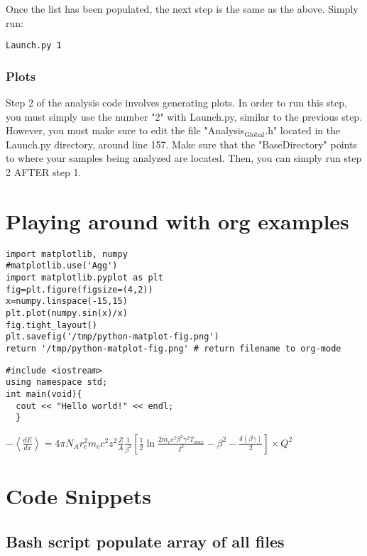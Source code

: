 \documentclass[11pt]{article}
\begin{document}
\begin{enumerate}
Once the list has been populated, the next step is the same as
the above. Simply run:

\begin{verbatim}
Launch.py 1
\end{verbatim}
\end{enumerate}

\subsubsection{Plots}
\label{sec-1-1-5}

Step 2 of the analysis code involves generating plots. In order to
run this step, you must simply use the number "2" with Launch.py,
similar to the previous step. However, you must make sure to edit
the file "Analysis$_{\text{Global}}$.h" located in the Launch.py directory,
around line 157. Make sure that the "BaseDirectory" points to
where your samples being analyzed are located. Then, you can
simply run step 2 AFTER step 1.


\section{Playing around with org examples}
\label{sec-2}

\begin{verbatim}
import matplotlib, numpy
#matplotlib.use('Agg')
import matplotlib.pyplot as plt
fig=plt.figure(figsize=(4,2))
x=numpy.linspace(-15,15)
plt.plot(numpy.sin(x)/x)
fig.tight_layout()
plt.savefig('/tmp/python-matplot-fig.png')
return '/tmp/python-matplot-fig.png' # return filename to org-mode
\end{verbatim}

\begin{verbatim}
#include <iostream>
using namespace std;
int main(void){
  cout << "Hello world!" << endl;
  }
\end{verbatim}

$-\left<\frac{dE}{dx}\right>=4\pi
        N_{A}r_{e}^2m_{e}c^2z^2\frac{Z}{A}\frac{1}{\beta^2}\left[\frac{1}{2}\ln\frac{2m_ec^2\beta^2\gamma^2T_{max}}{I^2}-\beta^2-\frac{\delta(\beta\gamma)}{2}\right]\times
        Q^2$




\section{Code Snippets}
\label{sec-3}
\subsection{Bash script populate array of all files}
\label{sec-3-1}
\end{document}
